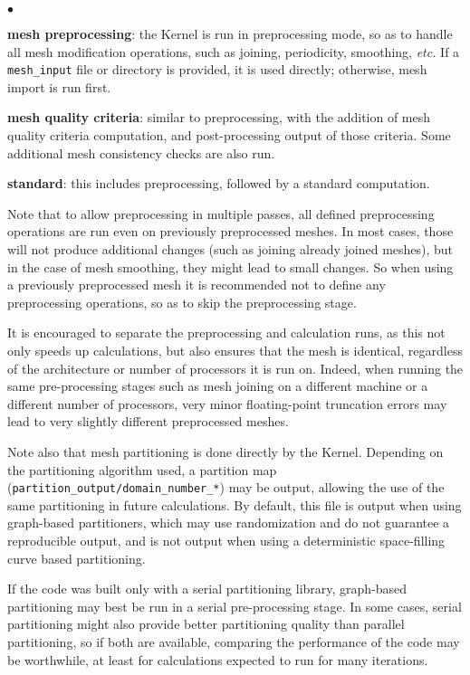 {{{{{\begin{list}{$\bullet$}{}
\item {\bf mesh preprocessing}: the Kernel is run in preprocessing mode, so as to handle all mesh modification operations, such as joining, periodicity, smoothing, \emph{etc.} If a \texttt{mesh\_input} file or directory is provided, it is used directly; otherwise, mesh import is run first.

\item {\bf mesh quality criteria}: similar to preprocessing, with the addition of mesh quality criteria computation, and post-processing output of those criteria. Some additional mesh consistency checks are also run.

\item {\bf standard}: this includes preprocessing, followed by a standard computation.

\end{list}

Note that to allow preprocessing in multiple passes, all defined preprocessing operations are run even on previously preprocessed meshes. In most cases, those will not produce additional changes (such as joining already joined meshes), but in the case of mesh smoothing, they might lead to small changes. So when using a previously preprocessed mesh it is recommended
not to define any preprocessing operations, so as to skip the preprocessing stage.

It is encouraged to separate the preprocessing and calculation runs, as
this not only speeds up calculations, but also ensures that the mesh is identical, regardless of the architecture or number of processors it is run on. Indeed, when running the same pre-processing stages such as mesh joining on a different machine or a different number of processors, very minor floating-point truncation errors may lead to very slightly different preprocessed meshes.

Note also that mesh partitioning is done directly by the Kernel.
Depending on the partitioning algorithm used, a partition map
(\texttt{partition\_output/domain\_number\_*}) may be output,
allowing the use of the same partitioning in future calculations.
By default, this file is output when using graph-based partitioners, which may
use randomization and do not guarantee a reproducible output, and is not output
when using a deterministic space-filling curve based partitioning.

If the code was built only with a serial partitioning library,
graph-based partitioning may best be run in a serial pre-processing stage.
In some cases, serial partitioning might also provide better partitioning
quality than parallel partitioning, so if both are available, comparing
the performance of the code may be worthwhile, at least for calculations
expected to run for many iterations.

}}}}}
